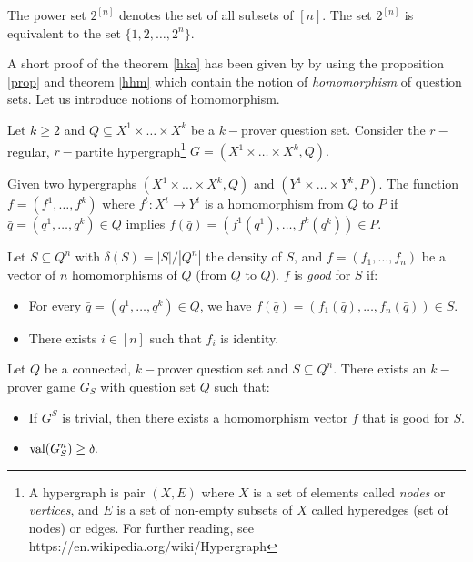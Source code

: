 The power set  $2^{[n]}$ denotes the set of all subsets of $[n]$. The set $2^{[n]}$ is equivalent to the set $\{1,2,\ldots, 2^n\}.$

A short proof of the theorem \eqref{hka} has been given by \cite{hkazla2016forbidden} by using the proposition \eqref{prop} and theorem \eqref{hhm} which contain  the notion of \textit{homomorphism} of question sets. Let us introduce notions of homomorphism.

Let $k\geq 2$ and $Q \subseteq X^1 \times \ldots \times X^k$ be a $k-$prover question set. Consider the $r-$regular, $r-$partite hypergraph\footnote{A hypergraph is pair $(X,E)$ where $X$ is a set of elements called \textit{nodes} or \textit{vertices}, and $E$ is a set of non-empty subsets of $X$ called hyperedges (set of nodes) or edges. For further reading, see https://en.wikipedia.org/wiki/Hypergraph} $G=(X^1 \times \ldots \times X^k, Q).$

 Given two hypergraphs $(X^1 \times \ldots \times X^k, Q)$ and $(Y^1 \times \ldots \times Y^k, P)$. The function $f=(f^1, \ldots, f^k)$ where $f^t: X^t \longrightarrow Y^t$ is a homomorphism from $Q$ to $P$ if $\bar{q}=(q^1, \ldots,q^k) \in Q$ implies $f(\bar{q})=(f^1(q^1), \ldots,f^k(q^k)) \in P.$

Let $S\subseteq Q^n$ with $\delta(S)= |S|/|Q^n|$ the density of $S$, and $f=(f_1, \ldots, f_n)$ be a vector of $n$ homomorphisms of $Q$ (from $Q$ to $Q$). $f$ is \textit{good} for $S$ if:
\begin{itemize}
\item For every $\bar{q}=(q^1, \ldots,q^k) \in Q$, we have $f(\bar{q})=(f_1(\bar{q}), \ldots, f_n(\bar{q})) \in S.$
\item There exists $i \in  [n]$ such that $f_i$ is identity.
\end{itemize}


\begin{thm}	Let $Q$ be a connected, $k-$prover question set and $S \subseteq Q^n$. There exists an $k-$prover game $G_S$ with question set $Q$ such that:
\begin{itemize}
\item If $G^S$ is trivial, then there exists a homomorphism vector $f$ that is good for $S$.
\item $\mathrm{val} (G_S^n) \geq \delta.$
\end{itemize} \label{hhm}	\end{thm} 

